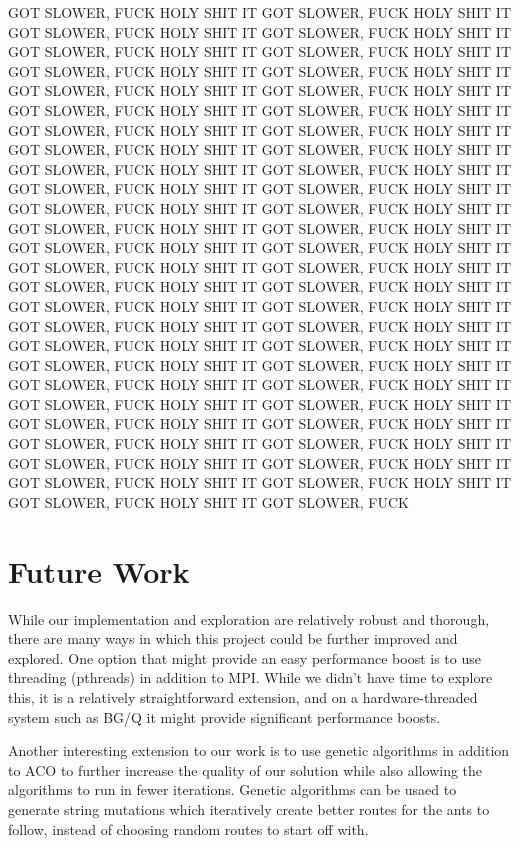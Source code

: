 \documentclass{acm_proc_article-sp}
\begin{document}
GOT SLOWER, FUCK HOLY SHIT IT GOT SLOWER, FUCK HOLY SHIT IT GOT SLOWER, FUCK HOLY SHIT IT GOT SLOWER, FUCK HOLY SHIT IT GOT SLOWER, FUCK HOLY SHIT IT GOT SLOWER, FUCK HOLY SHIT IT GOT SLOWER, FUCK HOLY SHIT IT GOT SLOWER, FUCK HOLY SHIT IT GOT SLOWER, FUCK HOLY SHIT IT GOT SLOWER, FUCK HOLY SHIT IT GOT SLOWER, FUCK HOLY SHIT IT GOT SLOWER, FUCK HOLY SHIT IT GOT SLOWER, FUCK HOLY SHIT IT GOT SLOWER, FUCK HOLY SHIT IT GOT SLOWER, FUCK HOLY SHIT IT GOT SLOWER, FUCK HOLY SHIT IT GOT SLOWER, FUCK HOLY SHIT IT GOT SLOWER, FUCK HOLY SHIT IT GOT SLOWER, FUCK HOLY SHIT IT GOT SLOWER, FUCK HOLY SHIT IT GOT SLOWER, FUCK HOLY SHIT IT GOT SLOWER, FUCK HOLY SHIT IT GOT SLOWER, FUCK HOLY SHIT IT GOT SLOWER, FUCK HOLY SHIT IT GOT SLOWER, FUCK HOLY SHIT IT GOT SLOWER, FUCK HOLY SHIT IT GOT SLOWER, FUCK HOLY SHIT IT GOT SLOWER, FUCK HOLY SHIT IT GOT SLOWER, FUCK HOLY SHIT IT GOT SLOWER, FUCK HOLY SHIT IT GOT SLOWER, FUCK HOLY SHIT IT GOT SLOWER, FUCK HOLY SHIT IT GOT SLOWER, FUCK HOLY SHIT IT GOT SLOWER, FUCK HOLY SHIT IT GOT SLOWER, FUCK HOLY SHIT IT GOT SLOWER, FUCK HOLY SHIT IT GOT SLOWER, FUCK HOLY SHIT IT GOT SLOWER, FUCK HOLY SHIT IT GOT SLOWER, FUCK HOLY SHIT IT GOT SLOWER, FUCK HOLY SHIT IT GOT SLOWER, FUCK HOLY SHIT IT GOT SLOWER, FUCK HOLY SHIT IT GOT SLOWER, FUCK HOLY SHIT IT GOT SLOWER, FUCK HOLY SHIT IT GOT SLOWER, FUCK HOLY SHIT IT GOT SLOWER, FUCK HOLY SHIT IT GOT SLOWER, FUCK HOLY SHIT IT GOT SLOWER, FUCK HOLY SHIT IT GOT SLOWER, FUCK HOLY SHIT IT GOT SLOWER, FUCK HOLY SHIT IT GOT SLOWER, FUCK HOLY SHIT IT GOT SLOWER, FUCK 

\section{Future Work}
While our implementation and exploration are relatively robust and thorough, there are many ways in
which this project could be further improved and explored. One option that might provide an easy performance
boost is to use threading (pthreads) in addition to MPI. While we didn't have time to explore this, it is a relatively
straightforward extension, and on a hardware-threaded system such as BG/Q it might provide significant
performance boosts.

Another interesting extension to our work is to use genetic algorithms in addition to ACO to further 
increase the quality of our solution while also allowing the algorithms to run in fewer iterations. Genetic
algorithms can be usaed to generate string mutations which iteratively create better routes for the ants to follow,
instead of choosing random routes to start off with.
\end{document}
